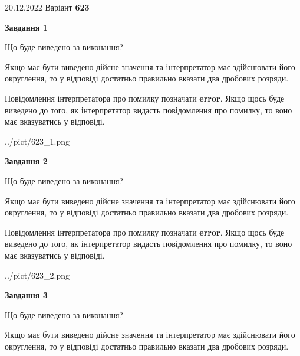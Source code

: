 \documentclass[12pt, ukrainian]{article}
\begin{document}
{20.12.2022 Варіант \No \textbf { 623 }\par}
{
\begin {Large}

{\begin {center}\textbf{Завдання 1}\end {center}}\par
Що буде виведено за виконання? \par

Якщо має бути виведено дійсне значення та інтерпретатор має здійснювати його округлення, 
то у відповіді достатньо правильно вказати два дробових розряди.

Повідомлення інтерпретатора про помилку позначати \textbf{error}.
Якщо щось буде виведено до того, як інтерпретатор видасть повідомлення про помилку, 
то воно має вказуватись у відповіді. \par

\begin{center}
	{../pict/623_1.png}
\end{center}
\newpage

{\begin {center}\textbf{Завдання 2}\end {center}}\par
Що буде виведено за виконання? \par

Якщо має бути виведено дійсне значення та інтерпретатор має здійснювати його округлення, 
то у відповіді достатньо правильно вказати два дробових розряди.

Повідомлення інтерпретатора про помилку позначати \textbf{error}.
Якщо щось буде виведено до того, як інтерпретатор видасть повідомлення про помилку, 
то воно має вказуватись у відповіді. \par

\begin{center}
	{../pict/623_2.png}
\end{center}
\newpage

{\begin {center}\textbf{Завдання 3}\end {center}}\par
Що буде виведено за виконання? \par

Якщо має бути виведено дійсне значення та інтерпретатор має здійснювати його округлення, 
то у відповіді достатньо правильно вказати два дробових розряди.


\end{Large}}
\end{document}
